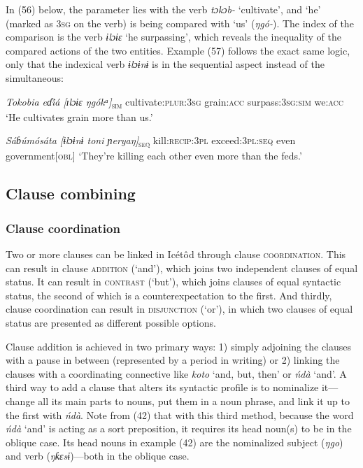 In (56) below, the parameter lies with the verb \textit{tɔkɔb-} ‘cultivate’, and ‘he’ (marked as 3\textsc{sg} on the verb) is being compared with ‘us’ (\textit{ŋgó-}). The index of the comparison is the verb \textit{ɨlɔɨɛ} ‘he surpassing’, which reveals the inequality of the compared actions of the two entities. Example (57) follows the exact same logic, only that the indexical verb \textit{ɨlɔɨnɨ} is in the sequential aspect instead of the simultaneous: 



\textit{Tokobia     eɗi̊á        [ɪlɔɨɛ     ŋgókᵃ]}\textsc{\textsubscript{sim}}
cultivate:\textsc{plur:3sg} grain:\textsc{acc} surpass:\textsc{3sg:sim} we:\textsc{acc}
‘He cultivates grain more than us.’




\textit{Sáɓúmósáta     [ɨlɔɨnɨ          toni  ɲeryaŋ]}\textsc{\textsubscript{seq}}
kill:\textsc{recip:3pl} exceed:\textsc{3pl:seq} even government[\textsc{obl}]
‘They’re killing each other even more than the feds.’






\subsection{Clause combining}
\subsubsection{Clause coordination}

Two or more clauses can be linked in Icétôd through clause \textsc{coordination}. This can result in clause \textsc{addition} (‘and’), which joins two independent clauses of equal status. It can result in \textsc{contrast} (‘but’), which joins clauses of equal syntactic status, the second of which is a counterexpectation to the first. And thirdly, clause coordination can result in \textsc{disjunction} (‘or’), in which two clauses of equal status are presented as different possible options.

Clause addition is achieved in two primary ways: 1) simply adjoining the clauses with a pause in between (represented by a period in writing) or 2) linking the clauses with a coordinating connective like \textit{koto} ‘and, but, then’ or \textit{ńdà} ‘and’. A third way to add a clause that alters its syntactic profile is to nominalize it—change all its main parts to nouns, put them in a noun phrase, and link it up to the first with \textit{ńdà}. Note from (42) that with this third method, because the word \textit{ńdà} ‘and’ is acting as a sort preposition, it requires its head noun(s) to be in the oblique case. Its head nouns in example (42) are the nominalized subject (\textit{ŋgo}) and verb (\textit{ŋƙɛsɨ})—both in the oblique case.

